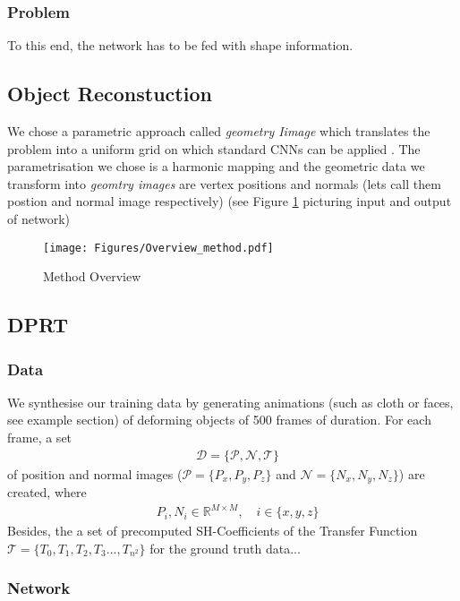 \subsubsection*{Problem}
To this end, the network has to be fed with shape information. \\ 

\subsection{Object Reconstuction}
We chose a parametric approach called \textit{geometry Iimage } which translates the problem into a uniform grid on which standard CNNs can be applied \cite{gu2002geometry, sinha2016deep}. The parametrisation we chose is a harmonic mapping and the geometric data we transform into \textit{geomtry images} are vertex positions and normals (lets call them postion and normal image respectively)  (see Figure \ref{Fig: Method_Overview} picturing input and output of network)
\begin{figure}[H]
  \centering
    \texttt{[image: Figures/Overview\_method.pdf]}
     \caption{Method Overview}
     \label{Fig: Method_Overview}
\end{figure}
\subsection{DPRT}
\subsubsection{Data}
We synthesise our training data by generating animations (such as cloth or faces, see example section) of deforming objects of 500 frames of duration. For each frame, a set
\begin{align*}
&\mathcal{D} = \{  \mathcal{P} , \mathcal{N} , \mathcal{T}\} 
\end{align*}
of position and normal images ($\mathcal{P}= \{ P_x , P_y, P_z \} $  and $\mathcal{N}= \{ N_x , N_y, N_z \} $) are created, where 
\begin{align*}
&P_i,N_i \in \mathbb{R}^{M \times M} ,
\quad
i \in \{x,y,z\}
\end{align*}
Besides, the a set of precomputed SH-Coefficients of the Transfer Function $\mathcal{T}= \{ T_0 , T_1, T_2, T_3..., T_{n^2} \} $  for the ground truth data...
\subsubsection{Network}



